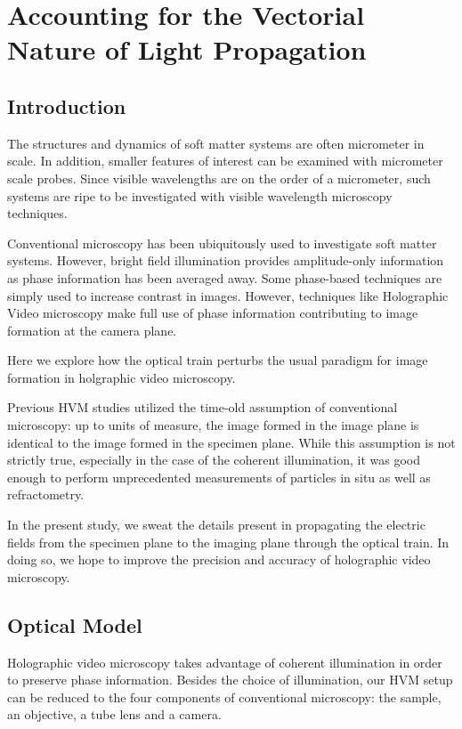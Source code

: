 \chapter{Accounting for the Vectorial Nature of Light Propagation}
\label{ch:debye}


\section{Introduction}
The structures and dynamics of soft matter systems are often micrometer in 
scale. In addition, smaller features of interest can be examined with micrometer
scale probes. Since visible wavelengths are on the order of a micrometer, such 
systems are ripe to be investigated with visible wavelength microscopy 
techniques.

Conventional microscopy has been ubiquitously used to investigate soft matter systems. However, bright field illumination provides amplitude-only information as phase information has been averaged away. Some phase-based techniques are simply used to increase contrast in images. However, techniques like Holographic Video microscopy make full use of phase information contributing to image formation at the camera plane.

Here we explore how the optical train perturbs the usual paradigm for image formation in holgraphic video microscopy. 

Previous HVM studies utilized the time-old assumption of conventional 
microscopy: up to units of measure, the image formed in the image plane is 
identical to the image formed in the specimen plane. While this assumption is 
not strictly true, especially in the case of the coherent illumination, it was good enough to perform unprecedented measurements of particles in situ as well as
refractometry.

In the present study, we sweat the details present in propagating the electric fields from the specimen plane to the imaging plane through the optical train. In doing so, we hope to improve the precision and accuracy of holographic video microscopy.

\section{Optical Model}
Holographic video microscopy takes advantage of coherent illumination in order
to preserve phase information. Besides the choice of illumination, our HVM setup can be reduced to the four components of conventional microscopy: the sample, an objective, a tube lens and a camera.

